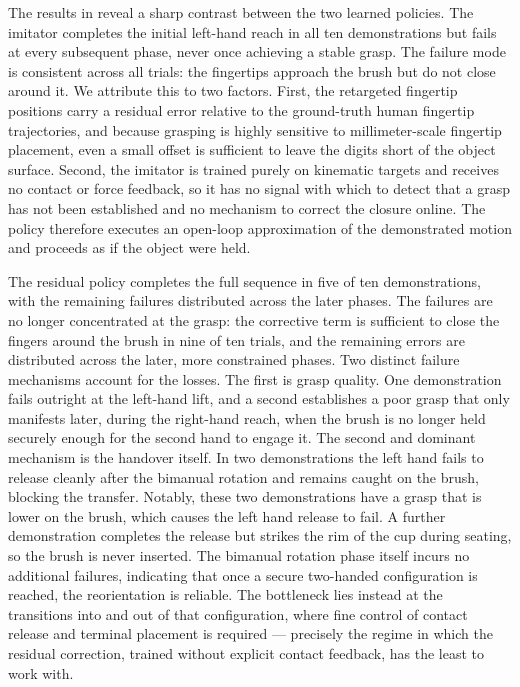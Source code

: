 The results in  reveal a sharp contrast between the two learned policies. The imitator completes the initial left-hand reach in all ten demonstrations but fails at every subsequent phase, never once achieving a stable grasp. The failure mode is consistent across all trials: the fingertips approach the brush but do not close around it. We attribute this to two factors. First, the retargeted fingertip positions carry a residual error relative to the ground-truth human fingertip trajectories, and because grasping is highly sensitive to millimeter-scale fingertip placement, even a small offset is sufficient to leave the digits short of the object surface. Second, the imitator is trained purely on kinematic targets and receives no contact or force feedback, so it has no signal with which to detect that a grasp has not been established and no mechanism to correct the closure online. The policy therefore executes an open-loop approximation of the demonstrated motion and proceeds as if the object were held.

The residual policy completes the full sequence in five of ten demonstrations, with the remaining failures distributed across the later phases. The failures are no longer concentrated at the grasp: the corrective term is sufficient to close the fingers around the brush in nine of ten trials, and the remaining errors are distributed across the later, more constrained phases. Two distinct failure mechanisms account for the losses. The first is grasp quality. One demonstration fails outright at the left-hand lift, and a second establishes a poor grasp that only manifests later, during the right-hand reach, when the brush is no longer held securely enough for the second hand to engage it. The second and dominant mechanism is the handover itself. In two demonstrations the left hand fails to release cleanly after the bimanual rotation and remains caught on the brush, blocking the transfer. Notably, these two demonstrations have a grasp that is lower on the brush, which causes the left hand release to fail. A further demonstration completes the release but strikes the rim of the cup during seating, so the brush is never inserted. The bimanual rotation phase itself incurs no additional failures, indicating that once a secure two-handed configuration is reached, the reorientation is reliable. The bottleneck lies instead at the transitions into and out of that configuration, where fine control of contact release and terminal placement is required — precisely the regime in which the residual correction, trained without explicit contact feedback, has the least to work with.

